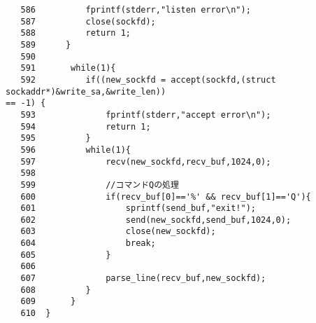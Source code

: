 \documentclass{jarticle}[11pt]
\begin{document}
\begin{verbatim}
   586	        fprintf(stderr,"listen error\n");
   587	        close(sockfd);
   588	        return 1;
   589	    }
   590	   
   591	     while(1){
   592	        if((new_sockfd = accept(sockfd,(struct sockaddr*)&write_sa,&write_len))　
== -1) {
   593	            fprintf(stderr,"accept error\n");
   594	            return 1;
   595	        }
   596	        while(1){
   597	            recv(new_sockfd,recv_buf,1024,0);
   598	
   599	            //コマンドQの処理
   600	            if(recv_buf[0]=='%' && recv_buf[1]=='Q'){
   601	                sprintf(send_buf,"exit!");
   602	                send(new_sockfd,send_buf,1024,0);
   603	                close(new_sockfd);
   604	                break;
   605	            }
   606	
   607	            parse_line(recv_buf,new_sockfd);  
   608	        }
   609	     }
   610	}
\end{verbatim}
\end{document}
